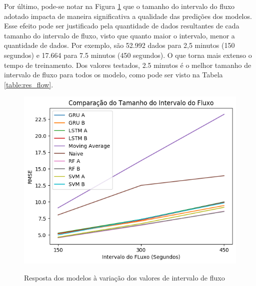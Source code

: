 Por último, pode-se notar na Figura \ref{figure:res_flow} que o tamanho do intervalo do fluxo adotado impacta de maneira significativa a qualidade das predições dos modelos. Esse efeito pode ser justificado pela quantidade de dados resultantes de cada tamanho do intervalo de fluxo, visto que quanto maior o intervalo, menor a quantidade de dados. Por exemplo, são 52.992 dados para 2,5 minutos (150 segundos) e 17.664 para 7.5 minutos (450 segundos). O que torna mais extenso o tempo de treinamento. Dos valores testados, 2.5 minutos é o melhor tamanho de intervalo de fluxo para todos os modelo, como pode ser visto na Tabela \ref{table:res_flow}.

\begin{figure}[H]
    \centering
    \includegraphics[scale=0.8]{monography/img/comparisons/comparacao_do_tamanho_do_intervalo_do_fluxo_rmse.png}
    \label{figure:res_flow}
    \caption{Resposta dos modelos à variação dos valores de intervalo de fluxo}
\end{figure}

